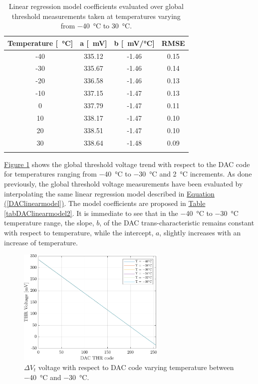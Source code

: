 \begin{table}[ht]
    \centering
    \begin{tabular}{c c c c} 
        \Xhline{2\arrayrulewidth}
        Temperature [\SI{}{\celsius}] & a [\SI{}{\milli\volt}] & b [\SI{}{\milli\volt/\celsius}] & RMSE \T\B \\
        \hline
        -40 & 335.12 & -1.46 & 0.15 \T\B \\
        -30 & 335.67 & -1.46 & 0.14 \T\B \\
        -20 & 336.58 & -1.46 & 0.13 \T\B \\
        -10 & 337.15 & -1.47 & 0.13 \T\B \\
        0 & 337.79 & -1.47 & 0.11 \T\B \\
        10 & 338.17 & -1.47 & 0.10 \T\B \\
        20 & 338.51 & -1.47 & 0.10 \T\B \\
        30 & 338.64 & -1.48 & 0.09 \T\B \\
        \Xhline{2\arrayrulewidth}
    \end{tabular}
    \caption{Linear regression model coefficients evaluated over global threshold measurements taken at temperatures varying from \SI{-40}{\celsius} to \SI{30}{\celsius}.}
    \label{tabDAClinearmodel1}
\end{table}

\par
\hyperref[figDACthrtemp4030]{Figure \ref{figDACthrtemp4030}} shows the global threshold voltage trend with respect to the DAC code for temperatures ranging from \SI{-40}{\celsius} to \SI{-30}{\celsius} and \SI{2}{\celsius} increments. As done previously, the global threshold voltage measurements have been evaluated by interpolating the same linear regression model described in \hyperref[DAClinearmodel]{Equation (\ref{DAClinearmodel})}. The model coefficients are proposed in \hyperref[tabDAClinearmodel2]{Table \ref{tabDAClinearmodel2}}. It is immediate to see that in the \SI{-40}{\celsius} to \SI{-30}{\celsius} temperature range, the slope, $b$, of the DAC trans-characteristic remains constant with respect to temperature, while the intercept, $a$, slightly increases with an increase of temperature.

\begin{figure}[h!]
    \centering
    \includegraphics[width=0.63\textwidth]{Images/chap1/results/DAC_thr/DAC_thr_voltage_40-30.pdf}
    \caption{$\Delta V_{\textit{t}}$ voltage with respect to DAC code varying temperature between \SI{-40}{\celsius} and \SI{-30}{\celsius}.}
    \label{figDACthrtemp4030}
\end{figure}

